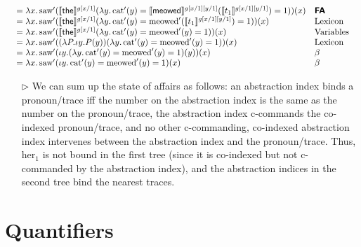\begin{itemize}
\[\begin{array}{c}
\begin{array}{r@{}ll}
			\\
			&{}= \lambda x.\,\text{saw}'(\sv{\textsf{the}}^{g[x/1]}(\lambda y.\,\text{cat}'(y) = \sv{\textsf{meowed}}^{g[x/1][y/1]}(\sv{t_1}^{g[x/1][y/1]})=1))(x) & \bsf{FA}%
			\\
			&{}= \lambda x.\,\text{saw}'(\sv{\textsf{the}}^{g[x/1]}(\lambda y.\,\text{cat}'(y) = \text{meowed}'(\sv{t_1}^{g[x/1][y/1]})=1))(x) & \text{Lexicon}%
			\\
			&{}= \lambda x.\,\text{saw}'(\sv{\textsf{the}}^{g[x/1]}(\lambda y.\,\text{cat}'(y) = \text{meowed}'(y)=1))(x) & \text{Variables}%
			\\
			&{}= \lambda x.\,\text{saw}'((\lambda P.\iota y.P(y))(\lambda y.\,\text{cat}'(y) = \text{meowed}'(y)=1))(x) & \text{Lexicon}%
			\\
			&{}= \lambda x.\,\text{saw}'(\iota y.(\lambda y.\,\text{cat}'(y) = \text{meowed}'(y)=1)(y))(x) & \beta%
			\\
			&{}= \lambda x.\,\text{saw}'(\iota y.\,\text{cat}'(y) = \text{meowed}'(y)=1)(x) & \beta%
		\end{array}
	\end{array}\]
	\begin{itemize}
		\item[$\rhd$] We can sum up the state of affairs as follows: an abstraction index binds a pronoun/trace iff the number on the abstraction index is the same as the number on the pronoun/trace, the abstraction index c-commands the co-indexed pronoun/trace, and no other c-commanding, co-indexed abstraction index intervenes between the abstraction index and the pronoun/trace. Thus, \textsf{her}$_1$ is not bound in the first tree (since it is co-indexed but not c-commanded by the abstraction index), and the abstraction indices in the second tree bind the nearest traces. %
	\end{itemize}
	
\end{itemize}


\section{Quantifiers}

